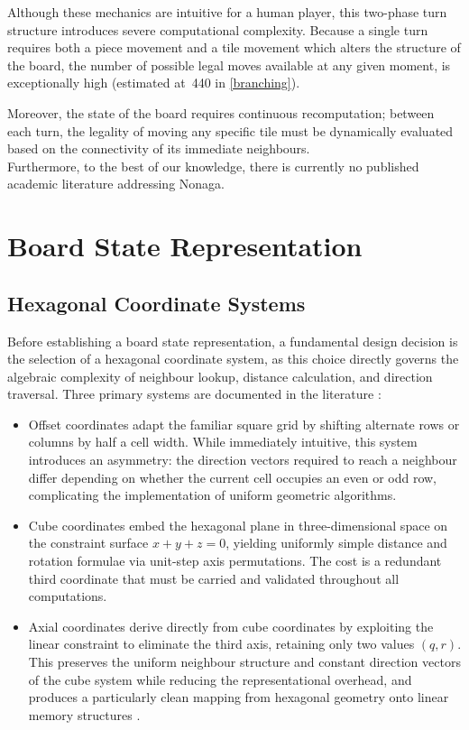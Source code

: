 Although these mechanics are intuitive for a human player, this two-phase turn structure introduces severe computational complexity. Because a single turn requires both a piece movement and a tile movement which alters the structure of the board, the number of possible legal moves available at any given moment, is exceptionally high (estimated at~440 in \cref{branching}).

Moreover, the state of the board requires continuous recomputation; between each turn, the legality of moving any specific tile must be dynamically evaluated based on the connectivity of its immediate neighbours.\\

Furthermore, to the best of our knowledge, there is currently no published academic literature addressing Nonaga.


\section{Board State Representation}

\subsection{Hexagonal Coordinate Systems}\label{sec:hex_coord}

Before establishing a board state representation, a fundamental design decision is the selection of a hexagonal coordinate system, as this choice directly governs the algebraic complexity of neighbour lookup, distance calculation, and direction traversal. Three primary systems are documented in the literature \cite{patel2013hexagons, 8848436}:
\begin{itemize}

  \item Offset coordinates adapt the familiar square grid by shifting alternate rows or columns by half a cell width. While immediately intuitive, this system introduces an asymmetry: the direction vectors required to reach a neighbour differ depending on whether the current cell occupies an even or odd row, complicating the implementation of uniform geometric algorithms.

  \item Cube coordinates embed the hexagonal plane in three-dimensional space on the constraint surface $x + y + z = 0$, yielding uniformly simple distance and rotation formulae via unit-step axis permutations. The cost is a redundant third coordinate that must be carried and validated throughout all computations.

  \item Axial coordinates derive directly from cube coordinates by exploiting the linear constraint to eliminate the third axis, retaining only two values $(q, r)$. This preserves the uniform neighbour structure and constant direction vectors of the cube system while reducing the representational overhead, and produces a particularly clean mapping from hexagonal geometry onto linear memory structures \cite{patel2013hexagons}.

\end{itemize}

